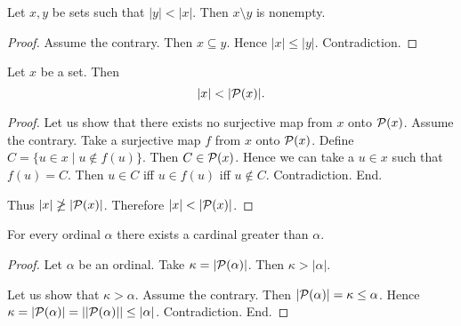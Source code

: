 \documentclass[10pt]{article}
\begin{document}
  \begin{forthel}
    \begin{proposition}
      Let $x, y$ be sets such that $|y| < |x|$.
      Then $x \setminus y$ is nonempty.
    \end{proposition}
    \begin{proof}
      Assume the contrary.
      Then $x \subseteq y$.
      Hence $|x| \leq |y|$.
      Contradiction.
    \end{proof}
  \end{forthel}

  \begin{forthel}
    \begin{theorem}
      Let $x$ be a set.
      Then \[ |x| < |\mathcal{P}(x)|. \]
    \end{theorem}
    \begin{proof}
      Let us show that there exists no surjective map from $x$ onto $\mathcal{P}(x)$.
        Assume the contrary.
        Take a surjective map $f$ from $x$ onto $\mathcal{P}(x)$.
        Define $C = \{ u \in x \mid u \notin f(u) \}$.
        Then $C \in \mathcal{P}(x)$.
        Hence we can take a $u \in x$ such that $f(u) = C$.
        Then $u \in C$ iff $u \in f(u)$ iff $u \notin C$.
        Contradiction.
      End.

      Thus $|x| \ngeq |\mathcal{P}(x)|$.
      Therefore $|x| < |\mathcal{P}(x)|$.
    \end{proof}
  \end{forthel}

  \begin{forthel}
    \begin{theorem}
      For every ordinal $\alpha$ there exists a cardinal greater than $\alpha$.
    \end{theorem}
    \begin{proof}
      Let $\alpha$ be an ordinal.
      Take $\kappa = |\mathcal{P}(\alpha)|$.
      Then $\kappa > |\alpha|$.

      Let us show that $\kappa > \alpha$.
        Assume the contrary.
        Then $|\mathcal{P}(\alpha)|
          = \kappa
          \leq \alpha$.
        Hence $\kappa
          = |\mathcal{P}(\alpha)|
          = ||\mathcal{P}(\alpha)||
          \leq |\alpha|$.
        Contradiction.
      End.
    \end{proof}
  \end{forthel}
\end{document}
